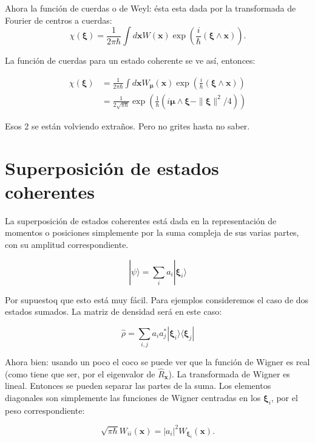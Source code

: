 \documentclass[a4paper,10pt]{article}
\newcommand{\xfase}{\mathbf{x}}
\newcommand{\xifase}{ {\boldsymbol{\xi}} }
\newcommand{\mufase}{ {\boldsymbol{\mu}} }
\newcommand{\bra}[1]{\langle #1|}
\newcommand{\ket}[1]{|#1\rangle}
\begin{document}
Ahora la función de cuerdas o de Weyl: ésta esta dada por la 
transformada de Fourier de centros a cuerdas:
\begin{equation}
\chi(\xifase)=\frac{1}{2\pi\hbar}\int d \xfase W(\xfase)
\exp\left(\frac{i}{ \hbar}(\xifase\wedge\xfase)\right).
\end{equation}

La función de cuerdas para un estado coherente se ve así, entonces:
 

\begin{equation}
\begin{split}
\chi(\xifase) & = \frac{1}{2\pi\hbar}\int d \xfase W_\mufase(\xfase)
\exp\left(\frac{i}{\hbar}(\xifase\wedge\xfase)\right)\\
 & = \frac{1}{2\sqrt{\pi\hbar}}
  \exp\left(\frac{1}{\hbar}(i\mufase\wedge\xifase - \|\xifase\|^2/4)\right)
\end{split}
\end{equation}

Esos 2 se están volviendo extraños. Pero no grites hasta no saber.

\section{Superposición de estados coherentes}

La superposición de estados coherentes está dada en la representación
de momentos o posiciones simplemente por la suma compleja de sus
varias partes, con su amplitud correspondiente.


\begin{equation}
\ket{\psi}=\sum_i a_i \ket{\xifase_i}
\end{equation}

Por supuestoq que esto está muy fácil. Para ejemplos consideremos
el caso de dos estados sumados.
La matriz de densidad será en este caso:

\begin{equation}
\hat{\rho}=\sum_{i,j} a_i a_j^* \ket{\xifase_i}\bra{\xifase_j}
\end{equation}

Ahora bien: usando un poco el coco se puede ver que
la función de Wigner es real (como tiene que ser, por el eigenvalor
de $\hat{R}_\xfase$).
La transformada de Wigner es lineal. Entonces se pueden separar
las partes de la suma.  Los elementos diagonales son simplemente
las funciones de Wigner centradas en los $\xifase_i$, por el 
peso correspondiente:

\begin{equation}
  \sqrt{\pi\hbar}W_{ii}(\xfase)=|a_i|^2 W_{\xifase_i}(\xfase).
\end{equation}
\end{document}

